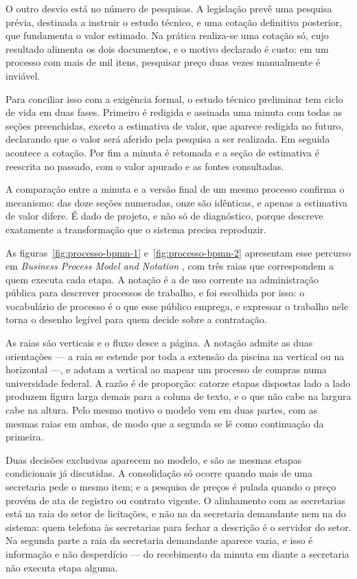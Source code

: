 O outro desvio está no número de pesquisas. A legislação prevê uma pesquisa
prévia, destinada a instruir o estudo técnico, e uma cotação definitiva
posterior, que fundamenta o valor estimado. Na prática realiza-se uma cotação
só, cujo resultado alimenta os dois documentos, e o motivo declarado é custo: em
um processo com mais de mil itens, pesquisar preço duas vezes manualmente é
inviável.

Para conciliar isso com a exigência formal, o estudo técnico preliminar tem
ciclo de vida em duas fases. Primeiro é redigida e assinada uma minuta com todas
as seções preenchidas, exceto a estimativa de valor, que aparece redigida no
futuro, declarando que o valor será aferido pela pesquisa a ser realizada. Em
seguida acontece a cotação. Por fim a minuta é retomada e a seção de estimativa
é reescrita no passado, com o valor apurado e as fontes consultadas.

A comparação entre a minuta e a versão final de um mesmo processo confirma o
mecanismo: das doze seções numeradas, onze são idênticas, e apenas a estimativa
de valor difere. É dado de projeto, e não só de diagnóstico, porque descreve
exatamente a transformação que o sistema precisa reproduzir.

As figuras~\ref{fig:processo-bpmn-1} e~\ref{fig:processo-bpmn-2} apresentam
esse percurso em \emph{Business Process Model and Notation}
\cite{omg2013bpmn}, com três raias que correspondem a quem executa cada etapa.
A notação é a de uso corrente na administração pública para descrever
processos de trabalho, e foi escolhida por isso: o vocabulário de processo é o
que esse público emprega, e expressar o trabalho nele torna o desenho legível
para quem decide sobre a contratação.

As raias são verticais e o fluxo desce a página. A notação admite as duas
orientações --- a raia se estende por toda a extensão da piscina na vertical
ou na horizontal ---, e  adotam a vertical ao
mapear um processo de compras numa universidade federal. A razão é de
proporção: catorze etapas dispostas lado a lado produzem figura larga demais
para a coluna de texto, e o que não cabe na largura cabe na altura. Pelo mesmo
motivo o modelo vem em duas partes, com as mesmas raias em ambas, de modo que
a segunda se lê como continuação da primeira.

Duas decisões exclusivas aparecem no modelo, e são as mesmas etapas condicionais
já discutidas. A consolidação só ocorre quando mais de uma secretaria pede o
mesmo item; e a pesquisa de preços é pulada quando o preço provém de ata de
registro ou contrato vigente. O alinhamento com as secretarias está na raia do
setor de licitações, e não na da secretaria demandante nem na do sistema:
quem telefona às secretarias para fechar a descrição é o servidor do setor. Na
segunda parte a raia da secretaria demandante aparece vazia, e isso é
informação e não desperdício --- do recebimento da minuta em diante a
secretaria não executa etapa alguma.

